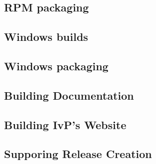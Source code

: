 \documentclass[letterpaper,10pt]{article}
\begin{document}
\subsection{RPM packaging}

\subsection{Windows builds}

\subsection{Windows packaging}

\subsection{Building Documentation}

\subsection{Building IvP's Website}

\subsection{Supporing Release Creation}
\end{document}
